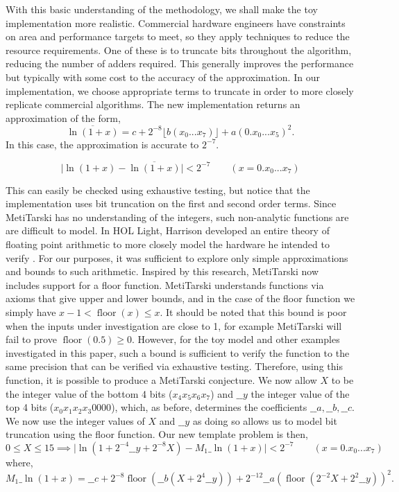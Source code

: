\documentclass{fac}
\newcommand{\abs}[1]{\lvert#1\rvert}
\newcommand{\floor}{\mathop{\textrm{floor}}\nolimits}
\begin{document}
With this basic understanding of the methodology, we shall make the toy implementation more realistic. Commercial hardware engineers have constraints on area and performance targets to meet, so they apply techniques to reduce the resource requirements. One of these is to truncate bits throughout the algorithm, reducing the number of adders required. This generally improves the performance but typically with some cost to the accuracy of the approximation. In our implementation, we choose appropriate terms to truncate in order to more closely replicate commercial algorithms. The new implementation returns an approximation of the form, 
\begin{equation} \label{update_toy}
\overline{\ln(1+x)}=c + 2^{-8} \lfloor{b(x_0...x_7)} \rfloor +a(0.x_0...x_5)^2. 
\end{equation}
In this case, the approximation is accurate to $2^{-7}$.

\[ \abs{\ln(1+x)-\overline{\ln(1+x)}} <2^{-7} \qquad (x= 0.x_0...x_7) \]

This can easily be checked using exhaustive testing, but notice that the implementation uses bit truncation on the first and second order terms. Since MetiTarski has no understanding of the integers, such non-analytic functions are are difficult to model. In HOL Light, Harrison developed an entire theory of floating point arithmetic to more closely model the hardware he intended to verify \cite{harrison1999machine}. For our purposes, it was sufficient to explore only simple approximations and bounds to such arithmetic. Inspired by this research, MetiTarski now includes support for a floor function. MetiTarski understands functions via axioms that give upper and lower bounds, and in the case of the floor function we simply have $x-1< \floor(x)\le x$. It should be noted that this bound is poor when the inputs under investigation are close to 1, for example MetiTarski will fail to prove $\floor(0.5)\geq 0$.
However, for the toy model and other examples investigated in this paper, such a bound is sufficient to verify the function to the same precision that can be verified via exhaustive testing. Therefore, using this function, it is possible to produce a MetiTarski conjecture. We now allow $X$ to be the integer value of the bottom 4 bits ($x_4x_5x_6x_7$) and $\_\_y$ the integer value of the top 4 bits ($x_0x_1x_2x_3 0000$), which, as before, determines the coefficients $\_\_a, \_\_b, \_\_c$. We now use the integer values of $X$ and $\_\_y$ as doing so allows us to model bit truncation using the floor function. Our new template problem is then, 
\[
0\le X \le 15 \implies \abs{\ln(1+2^{-4}\_\_y+2^{-8}X) - M_1\_\ln(1+x)} <2^{-7} \qquad (x= 0.x_0...x_7)
\]
where,
\[
M_1\_\ln(1+x)=\_\_c+2^{-8}\floor(\_\_b(X+2^{4}\_\_y))+2^{-12}\_\_a(\floor(2^{-2}X+2^{2}\_\_y))^2.
\]
\end{document}
